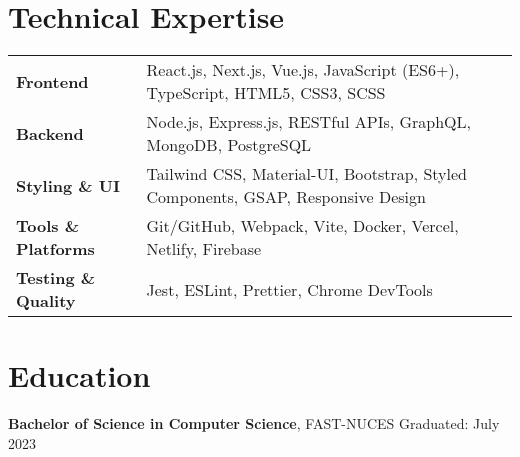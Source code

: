 \documentclass[11pt]{article}
\begin{document}
\section{Technical Expertise}
\begin{tabularx}{\textwidth}{@{} l X @{}}
\textbf{Frontend} & React.js, Next.js, Vue.js, JavaScript (ES6+), TypeScript, HTML5, CSS3, SCSS \\
\textbf{Backend} & Node.js, Express.js, RESTful APIs, GraphQL, MongoDB, PostgreSQL \\
\textbf{Styling \& UI} & Tailwind CSS, Material-UI, Bootstrap, Styled Components, GSAP, Responsive Design \\
\textbf{Tools \& Platforms} & Git/GitHub, Webpack, Vite, Docker, Vercel, Netlify, Firebase \\
\textbf{Testing \& Quality} & Jest, ESLint, Prettier, Chrome DevTools \\
\end{tabularx}

\section{Education}
\textbf{Bachelor of Science in Computer Science}, FAST-NUCES \hfill Graduated: July 2023 \\

\end{document}
